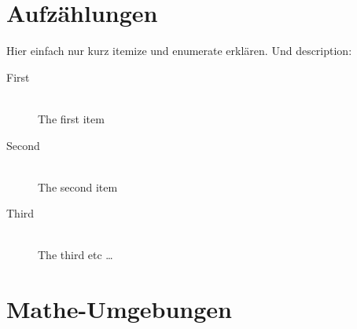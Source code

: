 \documentclass[11pt,a4paper]{scrartcl}
\begin{document}
\section{Aufzählungen}
Hier einfach nur kurz itemize und enumerate erklären. Und description:
\begin{description}
  \item[First] \hfill \\
  The first item
  \item[Second] \hfill \\
  The second item
  \item[Third] \hfill \\
  The third etc \ldots
\end{description}

\section{Mathe-Umgebungen}
\end{document}
